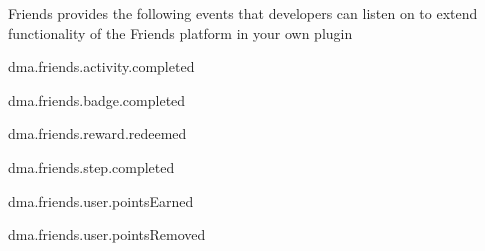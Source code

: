 Friends provides the following events that developers can listen on to extend functionality of the Friends platform in your own plugin


\begin{DoxyItemize}
\item dma.\+friends.\+activity.\+completed
\item dma.\+friends.\+badge.\+completed
\item dma.\+friends.\+reward.\+redeemed
\item dma.\+friends.\+step.\+completed
\item dma.\+friends.\+user.\+points\+Earned
\item dma.\+friends.\+user.\+points\+Removed 
\end{DoxyItemize}